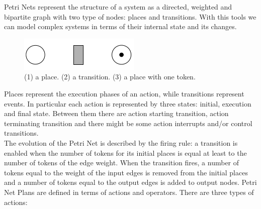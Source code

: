 \documentclass[pdftex,12pt,a4paper]{report}
\begin{document}
\noindent Petri Nets represent the structure of a system as a directed, weighted and bipartite graph with two type of nodes: places and transitions. With this tools we can model complex systems in terms of their internal state and its changes.
\begin{figure}[H]
	\centering
	\includegraphics[scale=0.6]{images/place_trans_token.png}
	\caption{(1) a place. (2) a transition. (3) a place with one token.}
\end{figure}
\noindent Places represent the execution phases of an action, while transitions represent events.
In particular each action is represented by three states: initial, execution and final state. Between them there are action starting transition, action terminating transition and there might be some action interrupts and/or control transitions. \\
The evolution of the Petri Net is described by the firing rule: a transition is enabled when the number of tokens for its initial places is equal at least to the number of tokens of the edge weight.
When the transition fires, a number of tokens equal to the weight of the input edges is removed from the initial places and a number of tokens equal to the output edges is added to output nodes.
Petri Net Plans are defined in terms of actions and operators. There are three types of actions:
\end{document}
